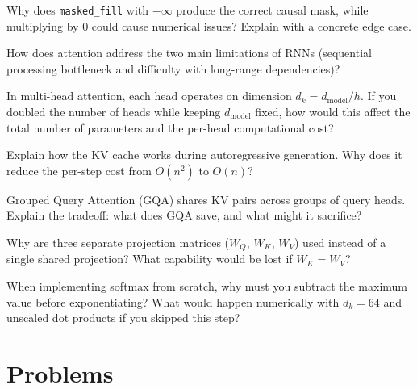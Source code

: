 \begin{reviewquestion}[8]
  Why does \texttt{masked\_fill} with $-\infty$ produce the correct
  causal mask, while multiplying by 0 could cause numerical issues?
  Explain with a concrete edge case.
\end{reviewquestion}

\begin{reviewquestion}[9]
  How does attention address the two main limitations of RNNs
  (sequential processing bottleneck and difficulty with long-range
  dependencies)?
\end{reviewquestion}

\begin{reviewquestion}[10]
  In multi-head attention, each head operates on dimension $d_k =
  d_{\text{model}} / h$. If you doubled the number of heads while
  keeping $d_{\text{model}}$ fixed, how would this affect the total
  number of parameters and the per-head computational cost?
\end{reviewquestion}

\begin{reviewquestion}[11]
  Explain how the KV cache works during autoregressive generation.
  Why does it reduce the per-step cost from $O(n^2)$ to $O(n)$?
\end{reviewquestion}

\begin{reviewquestion}[12]
  Grouped Query Attention (GQA) shares KV pairs across groups of query
  heads. Explain the tradeoff: what does GQA save, and what might it
  sacrifice?
\end{reviewquestion}

\begin{reviewquestion}[13]
  Why are three separate projection matrices ($W_Q$, $W_K$, $W_V$) used
  instead of a single shared projection? What capability would be lost
  if $W_K = W_V$?
\end{reviewquestion}

\begin{reviewquestion}[14]
  When implementing softmax from scratch, why must you subtract the
  maximum value before exponentiating? What would happen numerically
  with $d_k = 64$ and unscaled dot products if you skipped this step?
\end{reviewquestion}

\section*{Problems}

